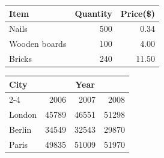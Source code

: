 \documentclass{article}
\begin{document}
\begin{tabular}{l|r|r}
\hline
Item & Quantity & Price(\$) \\
\hline
Nails & 500 & 0.34 \\
Wooden boards & 100 & 4.00 \\
Bricks & 240 & 11.50 \\
\end{tabular}

\vspace{1cm}

\begin{tabular}{l|r|r|r}
\hline
City & \multicolumn{3}{c}{Year} \\
\cline{2-4}
& 2006 & 2007 & 2008 \\
\hline
London & 45789 & 46551 & 51298 \\
Berlin & 34549 & 32543 & 29870 \\
Paris & 49835 & 51009 & 51970 \\
\end{tabular}
\end{document}
